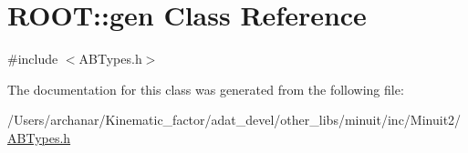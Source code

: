 \hypertarget{classROOT_1_1Minuit2_1_1gen}{}\section{R\+O\+OT\+:\+:gen Class Reference}
\label{classROOT_1_1Minuit2_1_1gen}


{\ttfamily \#include $<$A\+B\+Types.\+h$>$}



The documentation for this class was generated from the following file\+:\begin{DoxyCompactItemize}
\item 
/\+Users/archanar/\+Kinematic\+\_\+factor/adat\+\_\+devel/other\+\_\+libs/minuit/inc/\+Minuit2/\mbox{\hyperlink{other__libs_2minuit_2inc_2Minuit2_2ABTypes_8h}{A\+B\+Types.\+h}}\end{DoxyCompactItemize}
